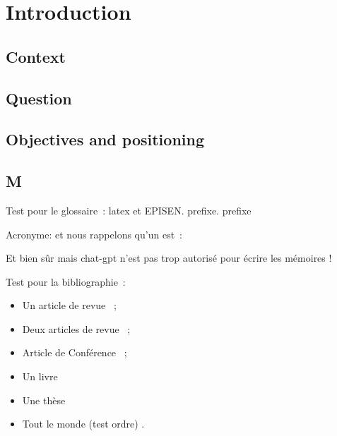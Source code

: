 \chapter*{Introduction}
\label{chap:intro}

{}
\section*{Context}

{}
\section*{Question}

{}
\section*{Objectives and positioning}

{}
\section*{M}

 \noindent Test pour le glossaire~:  \Gls{latex} et \Gls{EPISEN}. \Gls{prefixe}.
 \gls{prefixe}


 \noindent Acronyme:  et nous rappelons qu'un  est~: 


 \noindent Et bien sûr  mais chat-gpt n'est pas trop autorisé pour écrire les mémoires !  


\noindent Test pour la bibliographie~:
\begin{itemize}
\item Un article de revue \cite{ref1}~;
\item Deux articles de revue \cite{ref2,ref1}~;
\item Article de Conférence \cite{ref3}~;
\item Un livre \cite{ref4}
\item Une thèse \cite{ref5}
\item Tout le monde (test ordre) \cite{ref4,ref1,ref5,ref2,ref3}.
\end{itemize}

